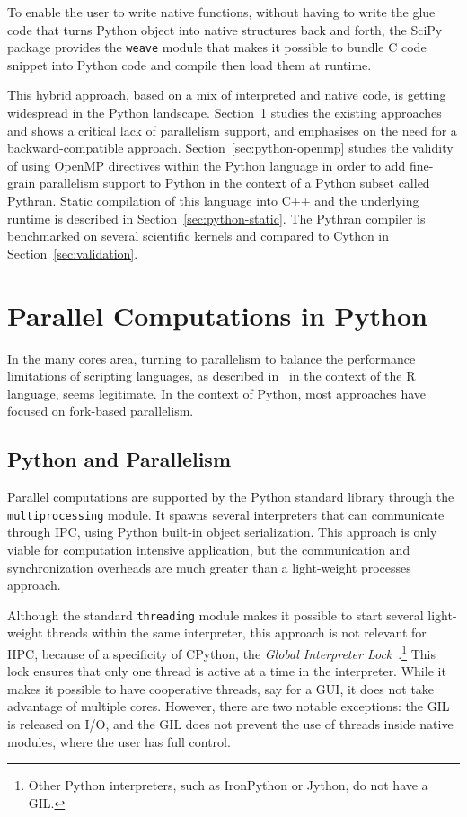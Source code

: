 \documentclass{llncs}
\begin{document}
To enable the user to write native functions, without having to write the glue
code that turns Python object into native structures back and forth, the SciPy
package provides the \texttt{weave} module that makes it possible to bundle C
code snippet into Python code and compile then load them at runtime.

This hybrid approach, based on a mix of interpreted and native code, is getting
widespread in the Python landscape. Section~\ref{sec:python-parallel} studies
the existing approaches and shows a critical lack of parallelism support, and
emphasises on the need for a backward-compatible approach.
Section~\ref{sec:python-openmp} studies the validity of using OpenMP directives
within the Python language in order to add fine-grain parallelism support to
Python in the context of a Python subset called Pythran. Static compilation of
this language into C++ and the underlying runtime is described in
Section~\ref{sec:python-static}. The Pythran compiler is benchmarked on several
scientific kernels and compared to Cython in Section~\ref{sec:validation}.

\section{Parallel Computations in Python}\label{sec:python-parallel}

In the many cores area, turning to parallelism to balance the performance
limitations of scripting languages, as described 
in~\cite{mals07} in the context of the R language, seems legitimate. In the
context of Python, most approaches have focused on fork-based parallelism.

\subsection{Python and Parallelism}

Parallel computations are supported by the Python standard library through the
\texttt{multiprocessing} module. It spawns several interpreters that can
communicate through IPC, using Python built-in object serialization. This
approach is only viable for computation intensive application, but the
communication and synchronization overheads are much greater than a light-weight
processes approach.

Although the standard \texttt{threading} module makes it possible to start
several light-weight threads within the same interpreter, this approach is not
relevant for HPC, because of a specificity of CPython, the \emph{Global
Interpreter Lock}~\cite{gil2012}.\footnote{Other Python interpreters, such as
IronPython or Jython, do not have a GIL.} This lock ensures that only one thread
is active at a time in the interpreter. While it makes it possible to have
cooperative threads, say for a GUI, it does not take advantage of multiple
cores.  However, there are two notable exceptions: the GIL is released on I/O,
and the GIL does not prevent the use of threads inside native modules, where the
user has full control.
\end{document}
